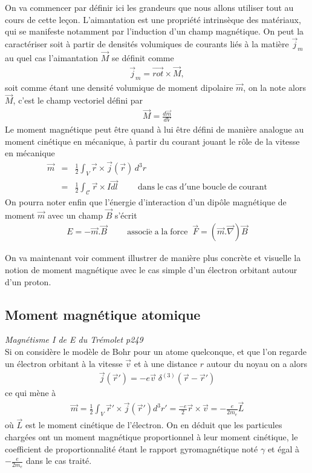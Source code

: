 \documentclass[12pt,prb,aps,epsf]{article}
\begin{document}
On va commencer par définir ici les grandeurs que nous allons utiliser tout au cours de cette leçon. L'aimantation est une propriété intrinsèque des matériaux, qui se manifeste notamment par l'induction d'un champ magnétique. On peut la caractériser soit à partir de densités volumiques de courants liés à la matière $\vec{j}_m$ au quel cas l'aimantation $\vec{M}$ se définit comme 
\begin{eqnarray}
\vec{j}_m = \vec{rot}\times \vec{M},
\end{eqnarray}  
soit comme étant une densité volumique de moment dipolaire $\vec{m}$, on la note alors $\vec{M}$, c'est le champ vectoriel défini par
\begin{eqnarray}
\vec{M} = \frac{d\vec{m}}{dV}
\end{eqnarray}
Le moment magnétique peut être quand à lui être défini de manière analogue au moment cinétique en mécanique, à partir du courant jouant le rôle de la vitesse en mécanique
\begin{eqnarray}
\vec{m} &=& \frac{1}{2}\int_{V}\vec{r}\times \vec{j}(\vec{r})\,d^3r\\
 &=& \frac{1}{2} \int_{\mathcal{C}} \vec{r}\times I\vec{dl}\hspace{1cm}\mathrm{dans\; le\; cas\; d'une\; boucle\;de\;courant}
\end{eqnarray}
On pourra noter enfin que l'énergie d'interaction d'un dipôle magnétique de moment $\vec{m}$ avec un champ $\vec{B}$ s'écrit 
\begin{eqnarray}
E = - \vec{m}.\vec{B}\hspace{1cm}\mathrm{associ\acute{e}\;a\;la\;force}\;\; \vec{F} = (\vec{m}.\vec{\nabla})\vec{B}
\end{eqnarray}

On va maintenant voir comment illustrer de manière plus concrète et visuelle la notion de moment magnétique avec le cas simple d'un électron orbitant autour d'un proton.

\subsection{Moment magnétique atomique}
\textit{Magnétisme I de E du Trémolet p249}\\

Si on considère le modèle de Bohr pour un atome quelconque, et que l'on regarde un électron orbitant à la vitesse $\vec{v}$ et à une distance $r$ autour du noyau on a alors 
\begin{eqnarray}
\vec{j}(\vec{r}') = -e\vec{v}\;\delta^{(3)}(\vec{r}-\vec{r}') 
\end{eqnarray}
ce qui mène à 
\begin{eqnarray}
\vec{m} = \frac{1}{2}\int_{V}\vec{r}'\times \vec{j}(\vec{r}')d^3r' = \frac{-e}{2}\vec{r}\times\vec{v} = -\frac{e}{2m_e}\vec{L}
\end{eqnarray}
où $\vec{L}$ est le moment cinétique de l'électron. On en déduit que les particules chargées ont un moment magnétique proportionnel à leur moment cinétique, le coefficient de proportionnalité étant le rapport gyromagnétique noté $\gamma$ et égal à $-\frac{e}{2m_e}$ dans le cas traité.\\  
\end{document}
